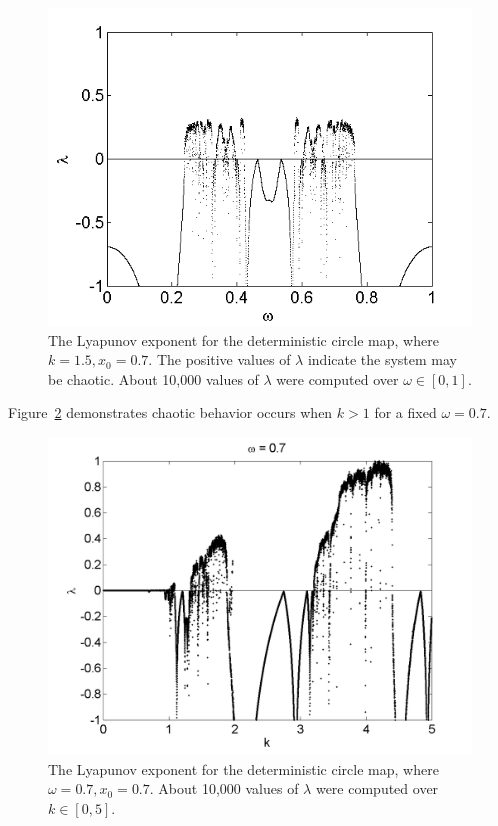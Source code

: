 \begin{figure}[!h]
\caption[Lyapunov exponent in the deterministic circle map, varying $\omega$]{The
  Lyapunov exponent for the deterministic
  circle map, where $k=1.5,x_0=0.7$. The positive values of $\lambda$
  indicate the system may be chaotic. About 10,000 values of $\lambda$
were computed over $\omega \in [0,1]$.}\label{fig:detcirclyap}
	\begin{center}%
		\includegraphics[scale=0.6]{figs/det_circ_lyap.png}
	\end{center}
\end{figure} 
Figure~\ref{fig:detcirclyapk} demonstrates chaotic behavior occurs
when $k > 1$ for a fixed $\omega = 0.7$.
\begin{figure}[!h]
\caption[Lyapunov exponent in the deterministic circle map, varying $k$]{The
  Lyapunov exponent for the deterministic
  circle map, where $\omega=0.7,x_0=0.7$. About 10,000 values of $\lambda$
were computed over $k \in [0,5]$.}\label{fig:detcirclyapk}
	\begin{center}
		\includegraphics[scale=0.45]{figs/det_circ_lyap_k.png}
	\end{center}
\end{figure} 
